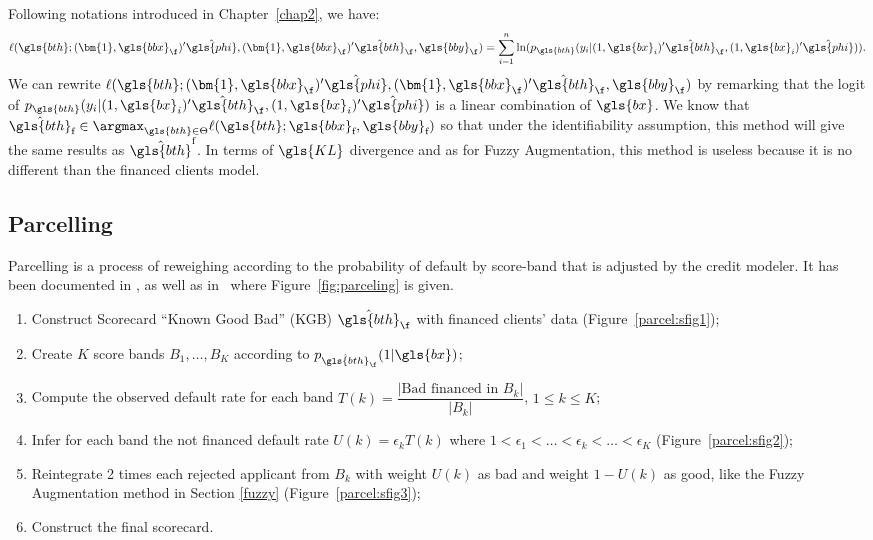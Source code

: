 Following notations introduced in Chapter~\ref{chap2}, we have:
\[ \ell(\gls{bth};(\bm{1},\gls{bbx}_{\f})' \hat{\gls{phi}}, (\bm{1},\gls{bbx}_{\f})' \hat{\gls{bth}}_\f, \gls{bby}_{\f}) = \sum_{i=1}^{n} \ln(p_{\gls{bth}}(y_i | (1, \gls{bx}_i)' \hat{\gls{bth}}_{\f}, (1, \gls{bx}_i)' \hat{\gls{phi}})).\]
We can rewrite $\ell(\gls{bth};(\bm{1},\gls{bbx}_{\f})' \hat{\gls{phi}}, (\bm{1},\gls{bbx}_{\f})' \hat{\gls{bth}}_\f, \gls{bby}_{\f})$ by remarking that the logit of $p_{\gls{bth}}(y_i | (1, \gls{bx}_i)' \hat{\gls{bth}}_{\f}, (1, \gls{bx}_i)' \hat{\gls{phi}})$ is a linear combination of $\gls{bx}$.
We know that $\hat{\gls{bth}}_{\text{f}} \in \argmax_{\gls{bth} \in \Theta} \ell(\gls{bth};\gls{bbx}_{\text{f}},\gls{bby}_{\text{f}})$ so that under the identifiability assumption, this method will give the same results as $\hat{\gls{bth}}^{\text{f}}$. In terms of $\gls{KL}$ divergence and as for Fuzzy Augmentation, this method is useless because it is no different than the financed clients model.

\subsection{Parcelling} \label{Parceling}

Parcelling is a process of reweighing according to the probability of default by score-band that is adjusted by the credit modeler. It has been documented in \cite{saporta,banasik,RI6}, as well as in~\cite{groupe} where Figure~\ref{fig:parceling} is given.

\begin{enumerate}
\item Construct Scorecard ``Known Good Bad'' (KGB) $\hat{\gls{bth}}_\f$ with financed clients' data (Figure~\ref{parcel:sfig1});
\item Create $K$ score bands $B_1, \ldots, B_K$ according to $p_{\hat{\gls{bth}}_\f}(1 | \gls{bx})$;
\item Compute the observed default rate for each band $T(k) = \dfrac{|\text{Bad financed in } B_k|}{|B_k|}$, $1 \leq k  \leq K$;
\item Infer for each band the not financed default rate $U(k) = \epsilon_k T(k)$ where $1 < \epsilon_1 < \ldots < \epsilon_k < \ldots < \epsilon_K$ (Figure~\ref{parcel:sfig2});
\item Reintegrate 2 times each rejected applicant from $B_k$ with weight $U(k)$ as bad and weight $1-U(k)$ as good, like the Fuzzy Augmentation method in Section \ref{fuzzy} (Figure~\ref{parcel:sfig3});
\item Construct the final scorecard.
\end{enumerate}

